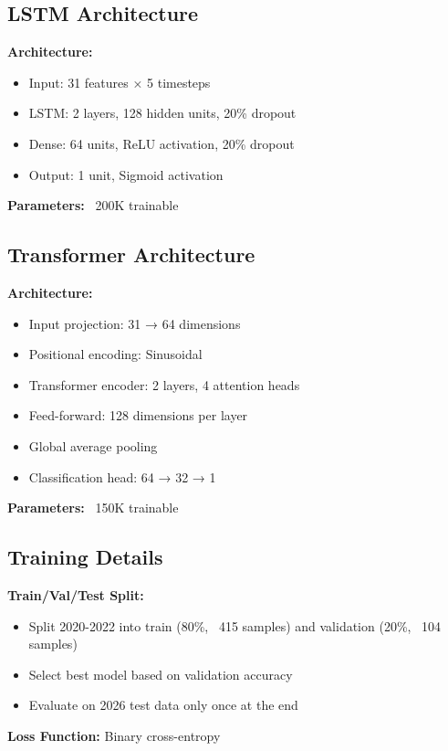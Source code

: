 \documentclass[10pt,twocolumn]{article}
\begin{document}
\subsection{LSTM Architecture}

\textbf{Architecture:}
\begin{itemize}
\item Input: 31 features × 5 timesteps
\item LSTM: 2 layers, 128 hidden units, 20\% dropout
\item Dense: 64 units, ReLU activation, 20\% dropout
\item Output: 1 unit, Sigmoid activation
\end{itemize}

\textbf{Parameters:} ~200K trainable

\subsection{Transformer Architecture}

\textbf{Architecture:}
\begin{itemize}
\item Input projection: 31 → 64 dimensions
\item Positional encoding: Sinusoidal
\item Transformer encoder: 2 layers, 4 attention heads
\item Feed-forward: 128 dimensions per layer
\item Global average pooling
\item Classification head: 64 → 32 → 1
\end{itemize}

\textbf{Parameters:} ~150K trainable

\subsection{Training Details}

\textbf{Train/Val/Test Split:}
\begin{itemize}
\item Split 2020-2022 into train (80\%, ~415 samples) and validation (20\%, ~104 samples)
\item Select best model based on validation accuracy
\item Evaluate on 2026 test data only once at the end
\end{itemize}

\textbf{Loss Function:} Binary cross-entropy
\end{document}

